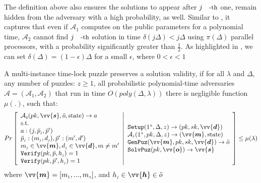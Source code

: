

The  definition above also ensures  the  solutions to appear after $j\text{\small{-th}}$ one,  remain hidden from the adversary with a high probability, as well. Similar to \cite{BonehBBF18,MalavoltaT19,garay2019}, it captures that even if     $\mathcal{A}_{\scriptscriptstyle 1}$ computes on the public parameters for a polynomial time,  $\mathcal{A}_{\scriptscriptstyle 2}$  cannot find $j\text{\small{-th}}$  solution in time $\delta(j\Delta)<j\Delta$ using $\pi(\Delta)$ parallel processors, with a probability significantly greater than $\frac{1}{2}$. As highlighted in  \cite{BonehBBF18}, we can set $\delta(\Delta)=(1-\epsilon)\Delta$ for a small  $\epsilon$, where $0<\epsilon<1$
\begin{definition}\label{Def::Solution-Validity}
A multi-instance time-lock puzzle preserves a   solution validity,   if  for all $\lambda$ and  $\Delta$,  any number of puzzles: $z\geq1$, all probabilistic polynomial-time adversaries $\mathcal{A}=(\mathcal{A}_{\scriptscriptstyle 1},\mathcal{A}_{\scriptscriptstyle 2})$ that run in  time $O(poly(\Delta,\lambda))$ there is  negligible function $\mu(.)$, such that: 
\small{
$$ Pr\left[
    \begin{array}{l}
 \mathcal{A}_{\scriptscriptstyle 2}(pk,\vv{\bm{s}}, \ddot{o},\text{state})\rightarrow a\\ 
 
 \text{s.t.}\\ 
a:(j,\ddot{p}_{\scriptscriptstyle j} ,\ddot{p}')\\
 \ddot{p}_{\scriptscriptstyle j}: (m_{\scriptscriptstyle j},d_{\scriptscriptstyle j}), 
\ddot{p}':(m',d') \\
 m_{\scriptscriptstyle j}\in \vv{{\bm{m}}}, d_{\scriptscriptstyle j}\in\vv{{\bm{d}}},
m\neq m'\\
\mathtt {Verify}(pk,\ddot{p},h_{\scriptscriptstyle j})= 1\\
\mathtt {Verify}(pk,\ddot{p}',h_{\scriptscriptstyle j})= 1\\
\end{array} 
\middle |
\begin{array}{l}

\mathtt{Setup}(1^{\scriptscriptstyle\lambda},\Delta,z)\rightarrow (pk,sk,\vv{\bm{d}})\\
\mathcal{A}_{\scriptscriptstyle 1}(1^{\scriptscriptstyle\lambda},pk, \Delta,z)\rightarrow (\vv{{\bm{m}}},\text{state})\\

\mathtt {GenPuz}(\vv{{\bm{m}}}, pk, sk,\vv{\bm{d}})\rightarrow \ddot{o} \\
\mathtt {SolvPuz}(pk,\vv{\bm{o}})\rightarrow \vv{\bm{s}}

\end{array} 
   \right]\leq  \mu(\lambda)$$
   }
where $\vv{{\bm{m}}}=[m_{\scriptscriptstyle 1},...,m_{\scriptscriptstyle z}]$, and $h_{\scriptscriptstyle j}\in \vv{\bm{h}}\in \ddot{o}$
\end{definition}



